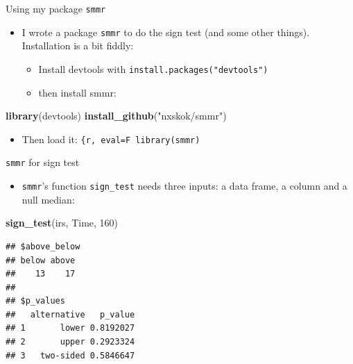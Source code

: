 \documentclass[ignorenonframetext,]{beamer}
\newenvironment{Shaded}{\begin{snugshade}}{\end{snugshade}}
\newcommand{\DecValTok}[1]{\textcolor[rgb]{0.00,0.00,0.81}{#1}}
\newcommand{\KeywordTok}[1]{\textcolor[rgb]{0.13,0.29,0.53}{\textbf{#1}}}
\newcommand{\NormalTok}[1]{#1}
\newcommand{\StringTok}[1]{\textcolor[rgb]{0.31,0.60,0.02}{#1}}
\providecommand{\tightlist}{%
  \setlength{\itemsep}{0pt}\setlength{\parskip}{0pt}}
\begin{document}
\begin{frame}[fragile]{Using my package \texttt{smmr}}
\protect\hypertarget{using-my-package-smmr}{}

\begin{itemize}
\tightlist
\item
  I wrote a package \texttt{smmr} to do the sign test (and some other
  things). Installation is a bit fiddly:

  \begin{itemize}
  \tightlist
  \item
    Install devtools with \texttt{install.packages("devtools")}
  \item
    then install smmr:
  \end{itemize}
\end{itemize}

\begin{Shaded}
\begin{Highlighting}[]
\KeywordTok{library}\NormalTok{(devtools)}
\KeywordTok{install_github}\NormalTok{(}\StringTok{"nxskok/smmr"}\NormalTok{)}
\end{Highlighting}
\end{Shaded}

\begin{itemize}
\tightlist
\item
  Then load it: \texttt{\{r,\ eval=F\ library(smmr)}
\end{itemize}

\end{frame}

\begin{frame}[fragile]{\texttt{smmr} for sign test}
\protect\hypertarget{smmr-for-sign-test}{}

\begin{itemize}
\tightlist
\item
  \texttt{smmr}'s function \texttt{sign\_test} needs three inputs: a
  data frame, a column and a null median:
\end{itemize}

\begin{Shaded}
\begin{Highlighting}[]
\KeywordTok{sign_test}\NormalTok{(irs, Time, }\DecValTok{160}\NormalTok{)}
\end{Highlighting}
\end{Shaded}

\begin{verbatim}
## $above_below
## below above 
##    13    17 
## 
## $p_values
##   alternative   p_value
## 1       lower 0.8192027
## 2       upper 0.2923324
## 3   two-sided 0.5846647
\end{verbatim}

\end{frame}
\end{document}

